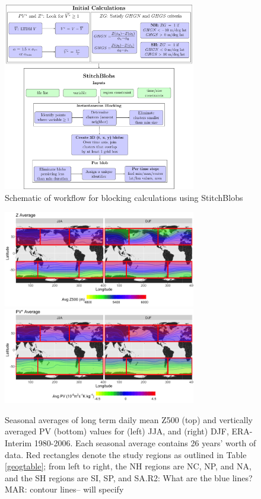 \documentclass[smallextended]{svjour3}       %
\numberwithin{equation}{section}
\begin{document}
\begin{figure}
\centering
\includegraphics[width=0.75\textwidth]{fig1.pdf}
\caption{Schematic of workflow for blocking calculations using StitchBlobs}\label{stitchfig}
\end{figure}

\begin{figure}
\centering
\includegraphics[width=0.75\textwidth]{fig2a}
\includegraphics[width=0.75\textwidth]{fig2b}
\caption{Seasonal averages of long term daily mean Z500 (top) and vertically averaged PV (bottom) values for (left) JJA, and (right) DJF, ERA-Interim 1980-2006. Each seasonal average contains 26 years' worth of data. Red rectangles denote the study regions as outlined in Table \ref{geogtable}; from left to right, the NH regions are NC, NP, and NA, and the SH regions are SI, SP, and SA.{\color{teal}R2: What are the blue lines?}{\color{blue}MAR: contour lines-- will specify}}\label{avg}
\end{figure}
\end{document}
